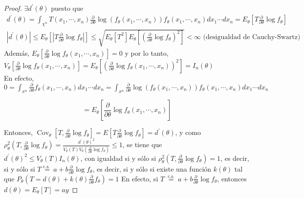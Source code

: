 \begin{proof}
  $\exists d^{\prime}(\theta)$ puesto que
  $$
    \begin{gathered}
      d^{\prime}(\theta)=\int_{\chi^{n}} T\left(x_{1}, \cdots, x_{n}\right) \frac{\partial}{\partial \theta} \log \left(f_{\theta}\left(x_{1}, \cdots, x_{n}\right)\right) f_{\theta}\left(x_{1}, \cdots, x_{n}\right) d x_{1} \cdots d x_{n}=E_{\theta}\left[T \frac{\partial}{\partial \theta} \log f_{\theta}\right] \\
      \left|d^{\prime}(\theta)\right| \leq E_{\theta}\left[\left|T \frac{\partial}{\partial \theta} \log f_{\theta}\right|\right] \leq \sqrt{E_{\theta}\left[T^{2}\right] E_{\theta}\left[\left(\frac{\partial}{\partial \theta} \log f_{\theta}\right)^{2}\right]}<\infty \text { (desigualdad de Cauchy-Swartz) }
    \end{gathered}
  $$
  Además, $E_{\theta}\left[\frac{\partial}{\partial \theta} \log f_{\theta}\left(x_{1}, \cdots, x_{n}\right)\right]=0$ y por lo tanto,\\
  $V_{\theta}\left[\frac{\partial}{\partial \theta} \log f_{\theta}\left(x_{1}, \cdots, x_{n}\right)\right]=E_{\theta}\left[\left(\frac{\partial}{\partial \theta} \log f_{\theta}\left(x_{1}, \cdots, x_{n}\right)\right)^{2}\right]=I_{n}(\theta)$\\
  En efecto, $0=\int_{x^{n}} \frac{\partial}{\partial \theta} f_{\theta}\left(x_{1}, \cdots, x_{n}\right) d x_{1} \cdots d x_{n}=\int_{x^{n}} \frac{\partial}{\partial \theta} \log \left(f_{\theta}\left(x_{1}, \cdots, x_{n}\right)\right) f_{\theta}\left(x_{1}, \cdots, x_{n}\right) d x_{1} \cdots d x_{n}$

  $$
    =E_{\theta}\left[\frac{\partial}{\partial \theta} \log f_{\theta}\left(x_{1}, \cdots, x_{n}\right)\right]
  $$

  Entonces, $\operatorname{Cov}_{\theta}\left[T, \frac{\partial}{\partial \theta}
      \log f_{\theta}\right]=E\left[T \frac{\partial}{\partial \theta} \log
      f_{\theta}\right]=d^{\prime}(\theta)$, y como $\rho_{\theta}^{2}\left(T,
    \frac{\partial}{\partial \theta} \log
    f_{\theta}\right)=\frac{d^{\prime}(\theta)^{2}}{V_{\theta}(T)
      V_{\theta}\left(\frac{\partial}{\partial \theta} \log f_{\theta}\right)} \leq
    1$, se tiene que\\ $d^{\prime}(\theta)^{2} \leq V_{\theta}(T) I_{n}(\theta)$,
  con igualdad si y sólo si $\rho_{\theta}^{2}\left(T, \frac{\partial}{\partial
      \theta} \log f_{\theta}\right)=1$, es decir, si y sólo si $T \stackrel{\text {
        c.s. }}{=} a+b \frac{\partial}{\partial \theta} \log f_{\theta}$, es decir, si
  y sólo si existe una función $k(\theta)$ tal que
  $P_{\theta}\left(T=d(\theta)+k(\theta) \frac{\partial}{\partial \theta}
    f_{\theta}\right)=1$ En efecto, si $T \stackrel{\text { c.s. }}{=} a+b
    \frac{\partial}{\partial \theta} \log f_{\theta}$, entonces
  $d(\theta)=E_{\theta}[T]=a y$


\end{proof}
